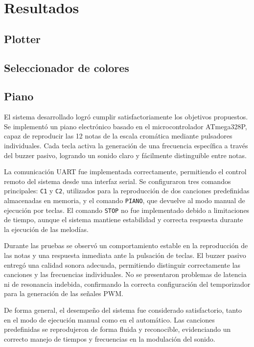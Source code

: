 \vspace{0.8cm}

\section{Resultados}
\subsection{Plotter}

\subsection{Seleccionador de colores}

\subsection{Piano}
El sistema desarrollado logró cumplir satisfactoriamente los objetivos propuestos. Se implementó un piano electrónico basado en el microcontrolador ATmega328P, capaz de reproducir las 12 notas de la escala cromática mediante pulsadores individuales. Cada tecla activa la generación de una frecuencia específica a través del buzzer pasivo, logrando un sonido claro y fácilmente distinguible entre notas.

La comunicación UART fue implementada correctamente, permitiendo el control remoto del sistema desde una interfaz serial. Se configuraron tres comandos principales: \texttt{C1} y \texttt{C2}, utilizados para la reproducción de dos canciones predefinidas almacenadas en memoria, y el comando \texttt{PIANO}, que devuelve al modo manual de ejecución por teclas. El comando \texttt{STOP} no fue implementado debido a limitaciones de tiempo, aunque el sistema mantiene estabilidad y correcta respuesta durante la ejecución de las melodías.

Durante las pruebas se observó un comportamiento estable en la reproducción de las notas y una respuesta inmediata ante la pulsación de teclas. El buzzer pasivo entregó una calidad sonora adecuada, permitiendo distinguir correctamente las canciones y las frecuencias individuales. No se presentaron problemas de latencia ni de resonancia indebida, confirmando la correcta configuración del temporizador para la generación de las señales PWM.

De forma general, el desempeño del sistema fue considerado satisfactorio, tanto en el modo de ejecución manual como en el automático. Las canciones predefinidas se reprodujeron de forma fluida y reconocible, evidenciando un correcto manejo de tiempos y frecuencias en la modulación del sonido.


